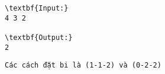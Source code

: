 \begin{verbatim}
\textbf{Input:}
4 3 2

\textbf{Output:}
2\end{verbatim}
\begin{verbatim}
Các cách đặt bi là (1-1-2) và (0-2-2)\end{verbatim}